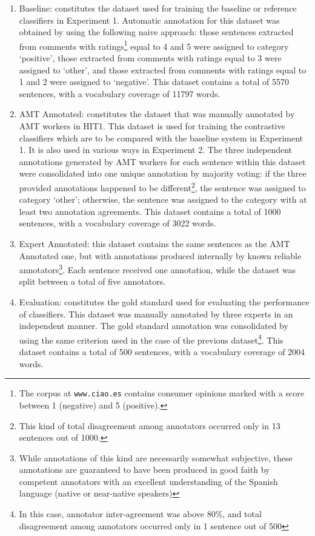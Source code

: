 \documentclass[11pt, a4paper,onecolumn]{article}
\begin{document}
\begin{enumerate}
\item Baseline: constitutes the dataset used for training the baseline or reference classifiers in Experiment 1. 
Automatic annotation for this dataset was obtained by using the following naive approach: those sentences extracted from
comments with ratings\footnote{The corpus at \texttt{www.ciao.es} contains consumer opinions marked with a score between 1 (negative) and 5 (positive).} equal to 4 and 5 were assigned to category `positive', those extracted from comments with ratings 
equal to 3 were assigned to `other', and those extracted from comments with ratings equal to 1 and 2 were assigned to
`negative'. This dataset contains a total of 5570 sentences, with a vocabulary coverage of 11797 words. 

\item AMT Annotated: constitutes the dataset that was manually annotated by AMT workers in HIT1.
This dataset is used for training the contrastive classifiers which are to be compared with the baseline system in Experiment 1.  It is also used in various ways in Experiment 2. 
The three independent annotations generated by AMT workers for each sentence within this dataset were consolidated into one unique annotation
by majority voting: if the three provided annotations happened to be
different\footnote{This kind of total disagreement among annotators occurred only in 13 sentences out of 1000.}, 
the sentence was assigned to category `other'; otherwise, the sentence was assigned to the category with
at least two annotation agreements. This dataset contains a total of 1000 sentences, with a vocabulary coverage 
of 3022 words. 

\item Expert Annotated: this dataset contains the same sentences as the AMT Annotated one, but with annotations produced internally by known reliable annotators\footnote{While annotations of this kind are necessarily somewhat subjective, these annotations are guaranteed to have been produced in good faith by competent annotators with an excellent understanding of the Spanish language (native or near-native speakers)}.  Each sentence received one annotation, while the dataset was split between a total of five annotators.

\item Evaluation: constitutes the gold standard used for evaluating the performance of classifiers.
This dataset was manually annotated by three experts in an independent manner. The gold standard annotation
was consolidated by using the same criterion used in the case of the previous dataset\footnote{In this case, 
annotator inter-agreement was above 80\%, and total disagreement among annotators occurred only in 1 sentence
out of 500}. This dataset contains a total of 500 sentences, with a vocabulary coverage of 2004 words.    
\end{enumerate} 
\end{document}
